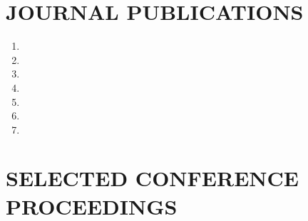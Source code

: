 \documentclass[10pt]{res} %
\begin{document}
\begin{resume}
% 
% 
% 
% 
% 
% 
% 
% 
% 


 
\section{JOURNAL PUBLICATIONS}

\begin{enumerate}
\item {}
\item {}
\item {}
\item {}
\item {}
\item {}
\item {}
\end{enumerate}
% 


\section{SELECTED CONFERENCE PROCEEDINGS}


\end{resume}
\end{document}
